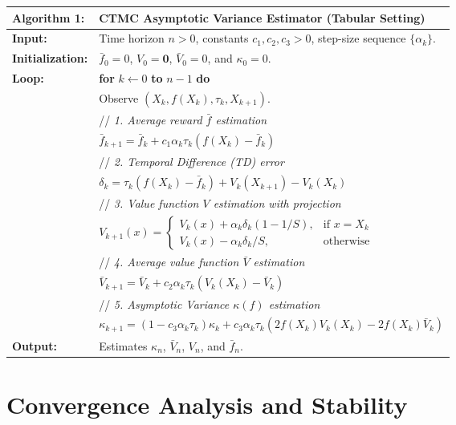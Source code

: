 \documentclass[11pt]{article}
\begin{document}
\begin{table}[H]
\centering
\begin{tabular}{lp{11cm}}
\toprule
\textbf{Algorithm 1:} & \textbf{CTMC Asymptotic Variance Estimator (Tabular Setting)} \\
\midrule
\textbf{Input:} & Time horizon $n > 0$, constants $c_1, c_2, c_3 > 0$, step-size sequence $\{\alpha_k\}$. \\
\textbf{Initialization:} & $\bar{f}_0 = 0$, $V_0 = \mathbf{0}$, $\bar{V}_0 = 0$, and $\kappa_0 = 0$. \\
\textbf{Loop:} & \textbf{for} $k \leftarrow 0$ \textbf{to} $n-1$ \textbf{do} \\
& \quad Observe $(X_k, f(X_k), \tau_k, X_{k+1})$. \\
& \quad // \textit{1. Average reward $\bar{f}$ estimation} \\
& \quad $\bar{f}_{k+1} = \bar{f}_k + c_1 \alpha_k \tau_k (f(X_k) - \bar{f}_k)$ \\
& \quad // \textit{2. Temporal Difference (TD) error} \\
& \quad $\delta_k = \tau_k (f(X_k) - \bar{f}_k) + V_k(X_{k+1}) - V_k(X_k)$ \\
& \quad // \textit{3. Value function $V$ estimation with projection} \\
& \quad $V_{k+1}(x) = \begin{cases}
    V_k(x) + \alpha_k \delta_k (1 - 1/S), & \text{if } x = X_k \\
    V_k(x) - \alpha_k \delta_k / S, & \text{otherwise}
\end{cases}$ \\
& \quad // \textit{4. Average value function $\bar{V}$ estimation} \\
& \quad $\bar{V}_{k+1} = \bar{V}_k + c_2 \alpha_k \tau_k (V_k(X_k) - \bar{V}_k)$ \\
& \quad // \textit{5. Asymptotic Variance $\kappa(f)$ estimation} \\
& \quad $\kappa_{k+1} = (1 - c_3 \alpha_k \tau_k) \kappa_k + c_3 \alpha_k \tau_k \left( 2f(X_k)V_k(X_k) - 2f(X_k)\bar{V}_k \right)$ \\
\textbf{Output:} & Estimates $\kappa_n$, $\bar{V}_n$, $V_n$, and $\bar{f}_n$. \\
\bottomrule
\end{tabular}
\end{table}

\section{Convergence Analysis and Stability}
\end{document}
